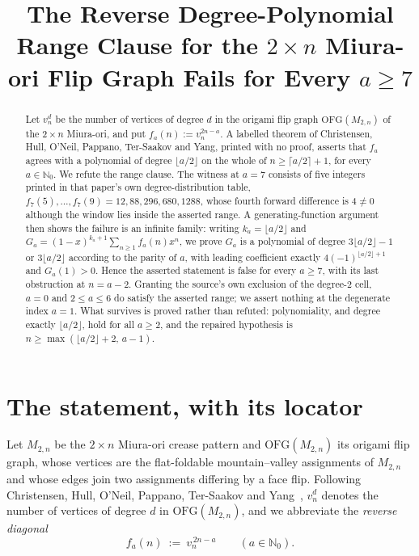 \documentclass[11pt]{amsart}
\title[The reverse degree-polynomial range clause fails for every $a\ge7$]
{The Reverse Degree-Polynomial Range Clause for the
 $2\times n$ Miura-ori Flip Graph Fails for Every $a\ge 7$}
\date{}
\theoremstyle{remark}
\newcommand{\OFG}{\mathrm{OFG}}
\newcommand{\N}{\mathbb{N}}
\begin{document}
\begin{abstract}
Let $v_n^d$ be the number of vertices of degree $d$ in the origami flip graph
$\OFG(M_{2,n})$ of the $2\times n$ Miura-ori, and put $f_a(n):=v_n^{2n-a}$.
A labelled theorem of Christensen, Hull, O'Neil, Pappano, Ter-Saakov and Yang,
printed with no proof, asserts that $f_a$ agrees with a polynomial of degree
$\lfloor a/2\rfloor$ on the whole of $n\ge\lceil a/2\rceil+1$, for every
$a\in\N_0$. We refute the range clause. The witness at $a=7$ consists of five
integers printed in that paper's own degree-distribution table,
$f_7(5),\dots,f_7(9)=12,88,296,680,1288$, whose fourth forward difference is
$4\ne 0$ although the window lies inside the asserted range. A
generating-function argument then shows the failure is an infinite family:
writing $k_a=\lfloor a/2\rfloor$ and
$G_a=(1-x)^{k_a+1}\sum_{n\ge1}f_a(n)x^n$, we prove $G_a$ is a polynomial of
degree $3\lfloor a/2\rfloor-1$ or $3\lfloor a/2\rfloor$ according to the parity
of $a$, with leading coefficient exactly $4(-1)^{\lfloor a/2\rfloor+1}$ and
$G_a(1)>0$. Hence the asserted statement is false for every $a\ge7$, with its
last obstruction at $n=a-2$. Granting the source's own exclusion of the
degree-$2$ cell, $a=0$ and $2\le a\le6$ do satisfy the asserted range; we assert
nothing at the degenerate index $a=1$. What survives
is proved rather than refuted: polynomiality, and degree exactly
$\lfloor a/2\rfloor$, hold for all $a\ge2$, and the repaired hypothesis is
$n\ge\max(\lfloor a/2\rfloor+2,\,a-1)$.
\end{abstract}

\maketitle

\section{The statement, with its locator}

Let $M_{2,n}$ be the $2\times n$ Miura-ori crease pattern and $\OFG(M_{2,n})$
its origami flip graph, whose vertices are the flat-foldable mountain--valley
assignments of $M_{2,n}$ and whose edges join two assignments differing by a
face flip. Following Christensen, Hull, O'Neil, Pappano, Ter-Saakov and
Yang~\cite{CHOPTY}, $v_n^d$ denotes the number of vertices of degree $d$ in
$\OFG(M_{2,n})$, and we abbreviate the \emph{reverse diagonal}
\[
  f_a(n) \ :=\ v_n^{\,2n-a}\qquad (a\in\N_0).
\]
\end{document}
